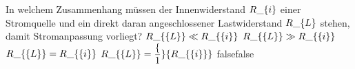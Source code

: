     {In welchem Zusammenhang müssen der Innenwiderstand $R\_\textrm\{i\}$ einer Stromquelle und ein direkt daran angeschlossener Lastwiderstand $R\_\textrm\{L\}$ stehen, damit Stromanpassung vorliegt?}
    {$R\_\{\textrm\{L\}\} \ll R\_\{\textrm\{i\}\}$}
    {$R\_\{\textrm\{L\}\} \gg R\_\{\textrm\{i\}\}$}
    {$R\_\{\textrm\{L\}\} = R\_\{\textrm\{i\}\}$}
    {$R\_\{\textrm\{L\}\} = \dfrac\{1\}\{R\_\{\textrm\{i\}\}\}$}
    {false}{false}